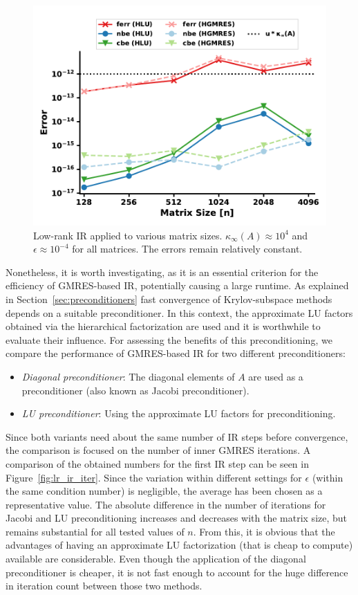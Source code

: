 \begin{figure}[h]
    \centering
    \includegraphics[width=0.7\linewidth]{chapters/5_experiments/figures/LR_size.pdf}
    \caption[Low-Rank IR - Matrix Size]{Low-rank IR applied to various matrix sizes. $\kappa_\infty(A) \approx 10^4$ and $\epsilon \approx 10^{-4}$ for all matrices. The errors remain relatively constant.}
    \label{fig:lr_ir_size}
\end{figure}

Nonetheless, it is worth investigating, as it is an essential criterion for the efficiency of GMRES-based IR, potentially causing a large runtime. As explained in Section~\hyperref[sec:preconditioners]{\ref{sec:preconditioners}} fast convergence of Krylov-subspace methods depends on a suitable preconditioner. In this context, the approximate LU factors obtained via the hierarchical factorization are used and it is worthwhile to evaluate their influence. For assessing the benefits of this preconditioning, we compare the performance of GMRES-based IR for two different preconditioners:
\begin{itemize}
    \item \textit{Diagonal preconditioner}: The diagonal elements of $A$ are used as a preconditioner (also known as Jacobi preconditioner).
    \item \textit{LU preconditioner}: Using the approximate LU factors for preconditioning.
\end{itemize}

\noindent Since both variants need about the same number of IR steps before convergence, the comparison is focused on the number of inner GMRES iterations. A comparison of the obtained numbers for the first IR step can be seen in Figure~\hyperref[fig:lr_ir_iter]{\ref{fig:lr_ir_iter}}. Since the variation within different settings for $\epsilon$ (within the same condition number) is negligible, the average has been chosen as a representative value. The absolute difference in the number of iterations for Jacobi and LU preconditioning increases and decreases with the matrix size, but remains substantial for all tested values of $n$. From this, it is obvious that the advantages of having an approximate LU factorization (that is cheap to compute) available are considerable. Even though the application of the diagonal preconditioner is cheaper, it is not fast enough to account for the huge difference in iteration count between those two methods. 

